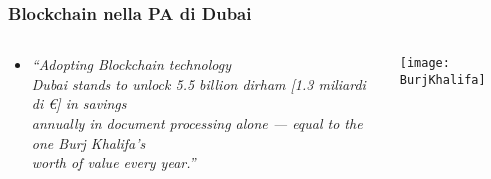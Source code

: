 \begin{frame}
 \frametitle{Blockchain nella PA di Dubai}


 \begin{columns}
 \begin{column}{0.7\textwidth}

  \begin{itemize}
   \item[] \emph{“Adopting Blockchain technology\\ Dubai stands to unlock 5.5
billion dirham [1.3 miliardi di \euro{}] in savings\\ annually in document
processing alone — equal to the one Burj Khalifa’s\\ worth of value every
year.” }
 \end{itemize}

 \end{column}
 \begin{column}{0.5\textwidth}  %
 \begin{center}
 \texttt{[image: BurjKhalifa]}
 \end{center}
 \end{column}
 \end{columns}



\end{frame}
